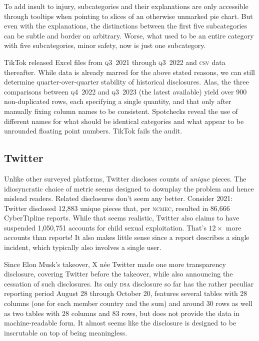 \documentclass[nonacm,screen]{acmart}
\newcommand\V[1]{\textsc{\MakeLowercase{#1}}}
\begin{document}
To add insult to injury, subcategories and their explanations are only
accessible through tooltips when pointing to slices of an otherwise unmarked pie
chart. But even with the explanations, the distinctions between the first five
subcategories can be subtle and border on arbitrary. Worse, what used to be an
entire category with five subcategories, minor safety, now is just one
subcategory.

TikTok released Excel files from \V{Q3}~2021 through \V{Q3}~2022 and \V{CSV}
data thereafter. While data is already marred for the above stated reasons, we
can still determine quarter-over-quarter stability of historical disclosures.
Alas, the three comparisons between \V{Q4}~2022 and \V{Q3}~2023 (the latest
available) yield over 900 non-duplicated rows, each specifying a single
quantity, and that only after manually fixing column names to be consistent.
Spotchecks reveal the use of different names for what should be identical
categories and what appear to be unrounded floating point numbers. TikTok fails
the audit.


\subsection{Twitter}

Unlike other surveyed platforms, Twitter discloses counts of \emph{unique}
pieces. The idiosyncratic choice of metric seems designed to downplay the
problem and hence mislead readers. Related disclosures don't seem any better.
Consider 2021: Twitter disclosed 12,883 unique pieces that, per \V{NCMEC},
resulted in 86,666 CyberTipline reports. While that seems realistic, Twitter
also claims to have suspended 1,050,751 accounts for child sexual exploitation.
That's $12\times$ more accounts than reports! It also makes little sense since a
report describes a single incident, which typically also involves a single user.

Since Elon Musk's takeover, X née Twitter made one more transparency disclosure,
covering Twitter before the takeover, while also announcing the cessation of
such disclosures. Its only \V{DSA} disclosure so far has the rather peculiar
reporting period August 28 through October 20, features several tables with 28
columns (one for each member country and the sum) and around 30 rows as well as
two tables with 28 columns and 83 rows, but does not provide the data in
machine-readable form. It almost seems like the disclosure is designed to be
inscrutable on top of being meaningless.
\end{document}
